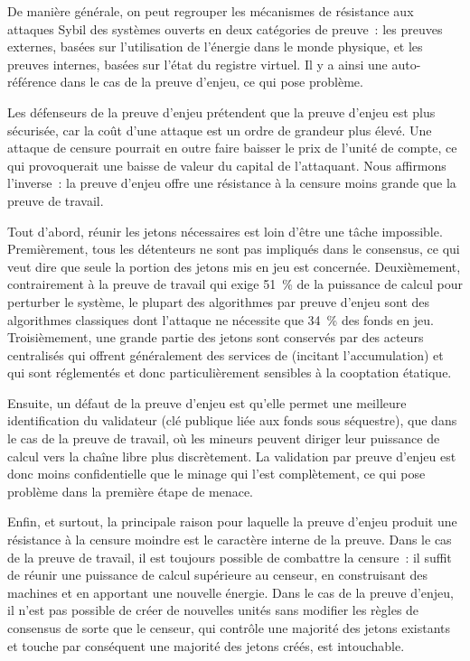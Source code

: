 De manière générale, on peut regrouper les mécanismes de résistance aux attaques Sybil des systèmes ouverts en deux catégories de preuve~: les preuves externes, basées sur l'utilisation de l'énergie dans le monde physique, et les preuves internes, basées sur l'état du registre virtuel. Il y a ainsi une auto-référence dans le cas de la preuve d'enjeu, ce qui pose problème.


Les défenseurs de la preuve d'enjeu prétendent que la preuve d'enjeu est plus sécurisée, car la coût d'une attaque est un ordre de grandeur plus élevé. Une attaque de censure pourrait en outre faire baisser le prix de l'unité de compte, ce qui provoquerait une baisse de valeur du capital de l'attaquant. Nous affirmons l'inverse~: la preuve d'enjeu offre une résistance à la censure moins grande que la preuve de travail.

Tout d'abord, réunir les jetons nécessaires est loin d'être une tâche impossible. Premièrement, tous les détenteurs ne sont pas impliqués dans le consensus, ce qui veut dire que seule la portion des jetons mis en jeu est concernée. Deuxièmement, contrairement à la preuve de travail qui exige 51~\% de la puissance de calcul pour perturber le système, le plupart des algorithmes par preuve d'enjeu sont des algorithmes classiques dont l'attaque ne nécessite que 34~\% des fonds en jeu. Troisièmement, une grande partie des jetons sont conservés par des acteurs centralisés qui offrent généralement des services de  (incitant l'accumulation) et qui sont réglementés et donc particulièrement sensibles à la cooptation étatique.

Ensuite, un défaut de la preuve d'enjeu est qu'elle permet une meilleure identification du validateur (clé publique liée aux fonds sous séquestre), que dans le cas de la preuve de travail, où les mineurs peuvent diriger leur puissance de calcul vers la chaîne libre plus discrètement. La validation par preuve d'enjeu est donc moins confidentielle que le minage qui l'est complètement, ce qui pose problème dans la première étape de menace.

Enfin, et surtout, la principale raison pour laquelle la preuve d'enjeu produit une résistance à la censure moindre est le caractère interne de la preuve. Dans le cas de la preuve de travail, il est toujours possible de combattre la censure~: il suffit de réunir une puissance de calcul supérieure au censeur, en construisant des machines et en apportant une nouvelle énergie. Dans le cas de la preuve d'enjeu, il n'est pas possible de créer de nouvelles unités sans modifier les règles de consensus de sorte que le censeur, qui contrôle une majorité des jetons existants et touche par conséquent une majorité des jetons créés, est intouchable.

